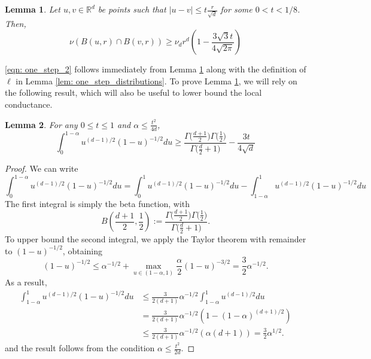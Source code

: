 \documentclass{article}
\newcommand{\Reals}{\mathbb{R}}
\newcommand{\abs}[1]{\left \lvert #1 \right \rvert}
\newcommand{\Rd}{\Reals^d}
\newcommand{\1}{\mathbf{1}}
\theoremstyle{alden}
\theoremstyle{aldenthm}
\newtheorem{lemma}{Lemma}
\theoremstyle{remark}
\begin{document}
\begin{lemma}
	\label{lem: overlap_balls_1}
	Let $u,v \in \Rd$ be points such that $\abs{u - v} \leq t\frac{r}{\sqrt{d}}$ for some $0 < t < 1/8$. Then,
	\begin{equation*}
	\nu(B(u,r) \cap B(v,r)) \geq \nu_d r^d \left(1 - \frac{3 \sqrt{3} t}{4\sqrt{2\pi}} \right)
	\end{equation*}
\end{lemma}

\eqref{eqn: one_step_2} follows immediately from Lemma \ref{lem: overlap_balls_1} along with the definition of $\ell$ in Lemma \ref{lem: one_step_distributions}. To prove Lemma \ref{lem: overlap_balls_1}, we will rely on the following result, which will also be useful to lower bound the local conductance.

\begin{lemma}
	\label{lem: beta_integral}
	For any $0 \leq t \leq 1$ and $\alpha \leq \frac{t^2}{4 d}$,
	\begin{equation*}
	\int_{0}^{1 - \alpha}u^{(d-1)/2}(1 - u)^{-1/2}du \geq \frac{\Gamma\bigl(\frac{d + 1}{2}\bigr)\Gamma\bigl(\frac{1}{2}\bigr)}{ \Gamma\bigl(\frac{d}{2}+ 1\bigr)} - \frac{3t}{4 \sqrt{d}}
	\end{equation*}
\end{lemma}
\begin{proof}
	We can write 
	\begin{equation*}
	\int_{0}^{1 - \alpha}u^{(d-1)/2}(1 - u)^{-1/2}du = \int_{0}^{1}u^{(d-1)/2}(1 - u)^{-1/2}du - \int_{1 - \alpha}^{1}u^{(d-1)/2}(1 - u)^{-1/2}du
	\end{equation*}
	The first integral is simply the beta function, with
	\begin{equation*}
	B(\frac{d+1}{2},\frac{1}{2}) := \frac{\Gamma\bigl(\frac{d + 1}{2}\bigr)\Gamma\bigl(\frac{1}{2}\bigr)}{ \Gamma\bigl(\frac{d}{2}+ 1\bigr)}.
	\end{equation*}
	To upper bound the second integral, we apply the Taylor theorem with remainder to $(1 - u)^{-1/2}$, obtaining
	\begin{equation*}
	(1 - u)^{-1/2} \leq \alpha^{-1/2} + \max_{u \in (1 - \alpha, 1)} \frac{\alpha}{2} (1 - u)^{-3/2} = \frac{3}{2}\alpha^{-1/2}.
	\end{equation*}
	As a result,
	\begin{align*}
	\int_{1 - \alpha}^{1}u^{(d-1)/2}(1 - u)^{-1/2}du & \leq \frac{3}{2(d+1)}\alpha^{-1/2} \int_{1 - \alpha}^{1}u^{(d-1)/2}du \\
	& = \frac{3}{2(d+1)}\alpha^{-1/2} \left(1 - (1 - \alpha)^{(d + 1)/2}\right) \\
	& \leq \frac{3}{2(d+1)}\alpha^{-1/2} (\alpha(d + 1)) =  \frac{3}{2}\alpha^{1/2}.
	\end{align*}
	and the result follows from the condition $\alpha \leq \frac{t^2}{2d}$. 
\end{proof}
\end{document}
